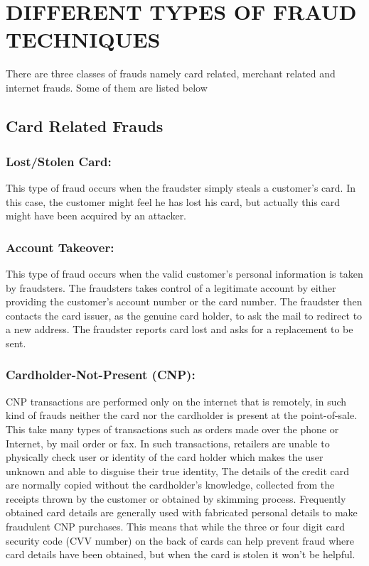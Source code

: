 \documentclass{report}
\begin{document}

\chapter{DIFFERENT TYPES OF FRAUD TECHNIQUES}

There are three classes of frauds namely card related, merchant related and internet frauds. Some of them are listed below
\paragraph{}

\section{Card Related Frauds}
\paragraph{}

\subsection{Lost/Stolen Card:}
 This type of fraud occurs when the fraudster simply steals a customer’s card. In this case, the customer might feel he has lost his card, but actually this card might have been acquired by an attacker. 

\subsection{Account Takeover:}
This type of fraud occurs when the valid customer’s personal information is taken by fraudsters. The fraudsters takes control of a legitimate account by either providing the customer’s account number or the card number. The fraudster then contacts the card issuer, as the genuine card holder, to ask the mail to redirect to a new address. The fraudster reports card lost and asks for a replacement to be sent. 

\subsection{Cardholder-Not-Present (CNP):}
CNP transactions are performed only on the internet that is remotely, in such kind of frauds neither the card nor the cardholder is present at the point-of-sale. This take many types of transactions such as orders made over the phone or Internet, by mail order or fax. In such transactions, retailers are unable to physically check user or identity of the card holder which makes the user unknown and able to disguise their true identity, The details of the credit card are normally copied without the cardholder’s knowledge, collected from the receipts thrown by the customer or obtained by skimming process. Frequently obtained card details are generally used with fabricated personal details to make fraudulent CNP purchases. This means that while the three or four digit card security code (CVV number) on the back of cards can help prevent fraud where card details have been obtained, but when the card is stolen it won’t be helpful.
 
\end{document}

